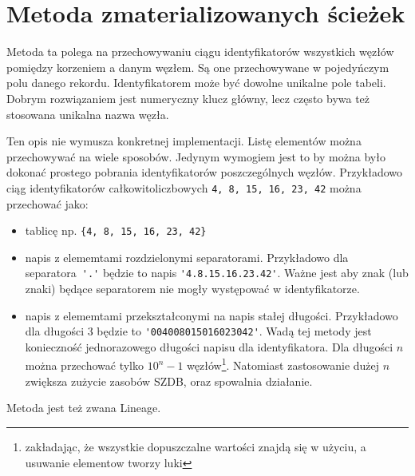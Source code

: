 \section{Metoda zmaterializowanych ścieżek}

Metoda ta polega na przechowywaniu ciągu identyfikatorów wszystkich węzłów pomiędzy korzeniem a danym węzłem.
Są one przechowywane w pojedyńczym polu danego rekordu. 
Identyfikatorem może być dowolne unikalne pole  tabeli.
Dobrym rozwiązaniem jest numeryczny klucz główny, lecz często bywa też stosowana unikalna nazwa węzła.


Ten opis nie wymusza konkretnej implementacji.
Listę elementów można przechowywać na wiele sposobów.
Jedynym wymogiem jest to by można było dokonać prostego pobrania identyfikatorów poszczególnych węzłów.
Przykładowo ciąg identyfikatorów całkowitoliczbowych \texttt{4, 8, 15, 16, 23, 42} można przechować jako:
\begin{itemize}
 \item tablicę  np. \verb|{4, 8, 15, 16, 23, 42}|
 \item napis z elememtami rozdzielonymi separatorami. 
    Przykładowo dla separatora~\verb|'.'| będzie to napis \verb|'4.8.15.16.23.42'|. 
    Ważne jest aby znak (lub znaki) będące separatorem nie mogły występować w identyfikatorze.
 \item napis z elememtami przekształconymi na napis stałej długości. 
    Przykładowo dla długości 3 będzie to \verb|'004008015016023042'|.
    Wadą tej metody jest konieczność jednorazowego długości napisu dla identyfikatora.
    Dla długości $n$ można przechować tylko $10^n-1$ węzłów\footnote{zakładając, że wszystkie dopuszczalne wartości znajdą się w użyciu, a usuwanie elementow tworzy luki}.
    Natomiast zastosowanie dużej $n$ zwiększa zużycie zasobów SZDB, oraz spowalnia działanie.
\end{itemize}





Metoda jest też zwana Lineage.




